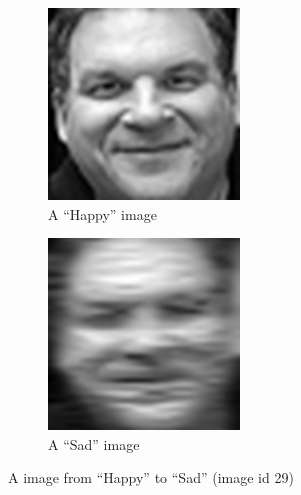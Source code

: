 \documentclass[12pt,a4paper]{extarticle}
\begin{document}
\begin{enumerate}
\begin{enumerate}
    \begin{figure}[H]
      \begin{subfigure}[t]{0.5\textwidth}
        \centering
        \includegraphics[width=0.8\linewidth]{images/adversial-id14-Sad-ep0.png}
        \caption{A ``Happy'' image}
        \label{fig:adversial-happy-image}
      \end{subfigure}
      \begin{subfigure}[t]{0.5\textwidth}
        \centering
        \includegraphics[width=0.8\linewidth]{images/adversial-id14-Sad-ep2500.png}
        \caption{A ``Sad'' image}
        \label{fig:adversial-sad-image}
      \end{subfigure}
      \caption{A image from ``Happy'' to ``Sad'' (image id 29)}
      \label{fig:adversial-images}
    \end{figure}
  \end{enumerate}

\end{enumerate}
\end{document}
